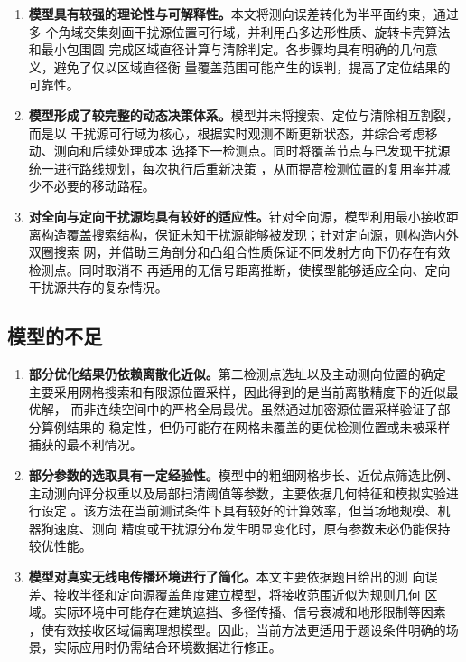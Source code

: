 \documentclass[withoutpreface,bwprint]{cumcmthesis} %
\begin{document}
\begin{enumerate}[leftmargin=1.45cm]
    \item \textbf{模型具有较强的理论性与可解释性。}本文将测向误差转化为半平面约束，通过多
    个角域交集刻画干扰源位置可行域，并利用凸多边形性质、旋转卡壳算法和最小包围圆
    完成区域直径计算与清除判定。各步骤均具有明确的几何意义，避免了仅以区域直径衡
    量覆盖范围可能产生的误判，提高了定位结果的可靠性。
    \item \textbf{模型形成了较完整的动态决策体系。}模型并未将搜索、定位与清除相互割裂，而是以
    干扰源可行域为核心，根据实时观测不断更新状态，并综合考虑移动、测向和后续处理成本
    选择下一检测点。同时将覆盖节点与已发现干扰源统一进行路线规划，每次执行后重新决策
    ，从而提高检测位置的复用率并减少不必要的移动路程。
    \item \textbf{对全向与定向干扰源均具有较好的适应性。}针对全向源，模型利用最小接收距
    离构造覆盖搜索结构，保证未知干扰源能够被发现；针对定向源，则构造内外双圈搜索
    网，并借助三角剖分和凸组合性质保证不同发射方向下仍存在有效检测点。同时取消不
    再适用的无信号距离推断，使模型能够适应全向、定向干扰源共存的复杂情况。
\end{enumerate}

\subsection{模型的不足}

\begin{enumerate}[leftmargin=1.45cm]
    \item \textbf{部分优化结果仍依赖离散化近似。}第二检测点选址以及主动测向位置的确定
    主要采用网格搜索和有限源位置采样，因此得到的是当前离散精度下的近似最优解，
    而非连续空间中的严格全局最优。虽然通过加密源位置采样验证了部分算例结果的
    稳定性，但仍可能存在网格未覆盖的更优检测位置或未被采样捕获的最不利情况。
    \item \textbf{部分参数的选取具有一定经验性。}模型中的粗细网格步长、近优点筛选比例、
    主动测向评分权重以及局部扫清阈值等参数，主要依据几何特征和模拟实验进行设定
    。该方法在当前测试条件下具有较好的计算效率，但当场地规模、机器狗速度、测向
    精度或干扰源分布发生明显变化时，原有参数未必仍能保持较优性能。
    \item \textbf{模型对真实无线电传播环境进行了简化。}本文主要依据题目给出的测
    向误差、接收半径和定向源覆盖角度建立模型，将接收范围近似为规则几何
    区域。实际环境中可能存在建筑遮挡、多径传播、信号衰减和地形限制等因素
    ，使有效接收区域偏离理想模型。因此，当前方法更适用于题设条件明确的场
    景，实际应用时仍需结合环境数据进行修正。
\end{enumerate}
\end{document}
